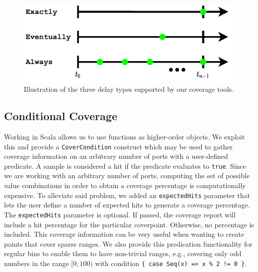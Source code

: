 \documentclass[conference]{IEEEtran}
\begin{document}
\begin{figure}
    \centering
    \includegraphics[width=.8\linewidth]{TimedCoverage.pdf}
    \caption{Illustration of the three delay types supported by our coverage tools.}
    \label{fig:delay}
\end{figure}

\subsection{Conditional Coverage} \label{sec:conditional_coverage}
Working in Scala allows us to use functions as higher-order objects. 
We exploit this and provide a \texttt{CoverCondition} construct which may be used to gather coverage information on an arbitrary number of ports with a user-defined predicate. %
A sample is considered a hit if the predicate evaluates to \texttt{true}. %
Since we are working with an arbitrary number of ports, computing the set of possible value combinations in order to obtain a coverage percentage is computationally expensive. 
To alleviate said problem, we added an \texttt{expectedHits} parameter that lets the user define a number of expected hits to generate a coverage percentage. The \texttt{expectedHits} parameter is optional. If passed, the coverage report will include a hit percentage for the particular coverpoint. Otherwise, no percentage is included.
This coverage information can be very useful when wanting to create points that cover sparse ranges.   
We also provide this predication functionality for regular bins to enable them to have non-trivial ranges, e.g., covering only odd numbers in the range $[0,100)$ with condition \texttt{\{ case Seq(x) => x \% 2 != 0 \}}.%
\end{document}
